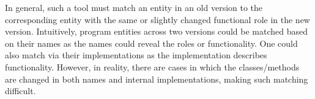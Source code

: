 



In general, such a tool must match an entity in an old version to the
corresponding entity with the same or slightly changed functional role
in the new version. Intuitively, program entities across two versions
could be matched based on their names as the names could reveal the
roles or functionality. One could also match via their implementations
as the implementation describes functionality. However, in reality,
there are cases in which the classes/methods are changed in both
names and internal implementations, making such matching difficult.

